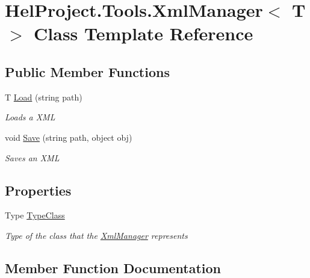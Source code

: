 \hypertarget{class_hel_project_1_1_tools_1_1_xml_manager}{}\section{Hel\+Project.\+Tools.\+Xml\+Manager$<$ T $>$ Class Template Reference}
\label{class_hel_project_1_1_tools_1_1_xml_manager}
\subsection*{Public Member Functions}
\begin{DoxyCompactItemize}
\item 
T \hyperlink{class_hel_project_1_1_tools_1_1_xml_manager_aaa77414aaedc8de70b8033fcbc776e20}{Load} (string path)
\begin{DoxyCompactList}\small\item\em Loads a X\+M\+L \end{DoxyCompactList}\item 
void \hyperlink{class_hel_project_1_1_tools_1_1_xml_manager_abe9006549ede6ee536ec111b75d17eae}{Save} (string path, object obj)
\begin{DoxyCompactList}\small\item\em Saves an X\+M\+L \end{DoxyCompactList}\end{DoxyCompactItemize}
\subsection*{Properties}
\begin{DoxyCompactItemize}
\item 
Type \hyperlink{class_hel_project_1_1_tools_1_1_xml_manager_a4c29b7a37cf80588e6bc8a45626262a5}{Type\+Class}
\begin{DoxyCompactList}\small\item\em Type of the class that the \hyperlink{class_hel_project_1_1_tools_1_1_xml_manager}{Xml\+Manager} represents \end{DoxyCompactList}\end{DoxyCompactItemize}


\subsection{Member Function Documentation}
\hypertarget{class_hel_project_1_1_tools_1_1_xml_manager_aaa77414aaedc8de70b8033fcbc776e20}{}
